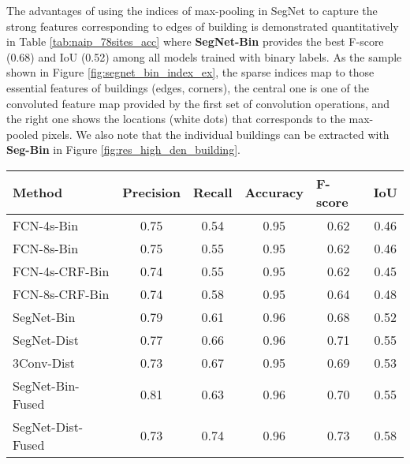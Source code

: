 \documentclass[journal]{IEEEtran}
\begin{document}
The advantages of using the indices of max-pooling in SegNet to capture the strong features corresponding to edges of building is demonstrated quantitatively in Table \ref{tab:naip_78sites_acc} where \textbf{SegNet-Bin} provides the best F-score (0.68) and IoU (0.52) among all models trained with binary labels. As the sample shown in Figure \ref{fig:segnet_bin_index_ex}, the sparse indices map to those essential features of buildings (edges, corners), the central one is one of the convoluted feature map provided by the first set of convolution operations, and the right one shows the locations (white dots) that corresponds to the max-pooled pixels. We also note that the individual buildings can be extracted with \textbf{Seg-Bin} in Figure \ref{fig:res_high_den_building}. 

\begin{table*}[htbp]	
	\centering
	
	\caption{Building extraction results of the disjoint 78 testing sites}
	
	\begin{tabular}{lccccc}
		
		\hline\hline
		
		Method & \multicolumn{1}{l}{Precision} & \multicolumn{1}{l}{Recall} & \multicolumn{1}{l}{Accuracy} &\multicolumn{1}{l}{F-score} & \multicolumn{1}{l}{IoU} \\
		
		\hline\hline
		
		FCN-4s-Bin & 0.75  & 0.54  & 0.95&0.62  & 0.46 \\
		
		FCN-8s-Bin & 0.75  & 0.55  & 0.95& 0.62  & 0.46 \\
		
		\hline
		
		FCN-4s-CRF-Bin & 0.74  & 0.55  & 0.95&0.62  & 0.45 \\
		
		FCN-8s-CRF-Bin & 0.74  & 0.58  & 0.95&0.64  & 0.48 \\
	
		\hline
		
		SegNet-Bin & 0.79  & 0.61  & 0.96 & 0.68  & 0.52 \\
		
		SegNet-Dist & 0.77  & 0.66  & 0.96& 0.71  & 0.55 \\
		\hline
		3Conv-Dist&0.73&0.67& 0.95&0.69&0.53\\
		\hline
		SegNet-Bin-Fused &0.81 &0.63&0.96&0.70&0.55\\
		SegNet-Dist-Fused& 0.73 & 0.74& 0.96&0.73& 0.58\\
		\hline\hline
		
	\end{tabular}%
	
	\label{tab:naip_78sites_acc}%
	
\end{table*}%
\end{document}
